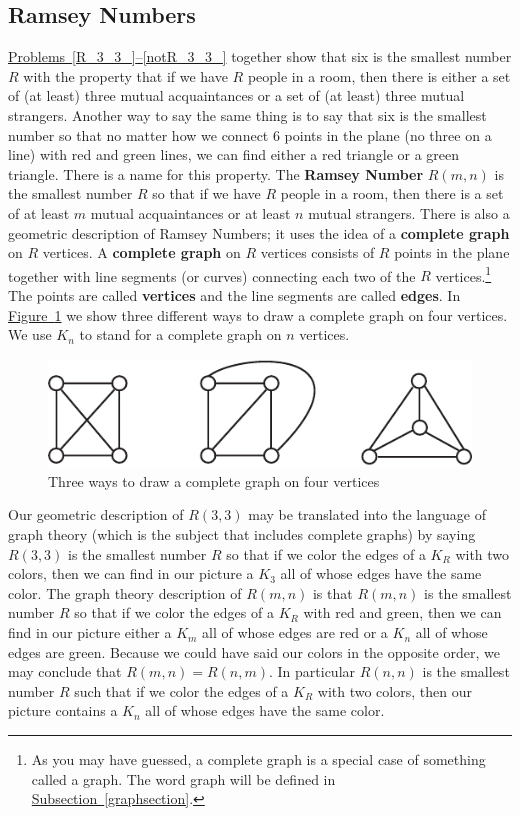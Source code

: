 \documentclass[10pt,]{book}
\newcommand{\terminology}[1]{\textbf{#1}}
\theoremstyle{plain}
\theoremstyle{definition}
\theoremstyle{definition}
\numberwithin{equation}{chapter}
\begin{document}
\subsection[{Ramsey Numbers}]{Ramsey Numbers}\label{Ramseysection}
\hyperref[R_3_3_]{Problems~\ref{R_3_3_}--\ref{notR_3_3_}} together show that six is the smallest number \(R\) with the property that if we have \(R\) people in a room, then there is either a set of (at least) three mutual acquaintances or a set of (at least) three mutual strangers. Another way to say the same thing is to say that six is the smallest number so that no matter how we connect 6 points in the plane (no three on a line) with red and green lines, we can find either a red triangle or a green triangle. There is a name for this property. The \terminology{Ramsey Number} \(R(m,n)\) is the smallest number \(R\) so that if we have \(R\) people in a room, then there is a set of at least \(m\) mutual acquaintances or at least \(n\) mutual strangers. There is also a geometric description of Ramsey Numbers; it uses the idea of a \terminology{complete graph} on \(R\) vertices. A \terminology{complete graph} on \(R\) vertices consists of \(R\) points in the plane together with line segments (or curves) connecting each two of the \(R\) vertices.\footnote{As you may have guessed, a complete graph is a special case of something called a graph.  The word graph will be defined in \hyperref[graphsection]{Subsection~\ref{graphsection}}.\label{fn-4}} The points are called \terminology{vertices} and the line segments are called \terminology{edges}. In \hyperref[completegraph]{Figure~\ref{completegraph}} we show three different ways to draw a complete graph on four vertices. We use \(K_n\) to stand for a complete graph on \(n\) vertices.%
\begin{figure}
\centering
\includegraphics[width=0.5\linewidth]{images/threeK4s}
\caption{Three ways to draw a complete graph on four vertices\label{completegraph}}
\end{figure}
Our geometric description of \(R(3,3)\) may be translated into the language of graph theory (which is the subject that includes complete graphs) by saying \(R(3,3)\) is the smallest number \(R\) so that if we color the edges of a \(K_R\) with two colors, then we can find in our picture a \(K_3\) all of whose edges have the same color.  The graph theory description of \(R(m,n)\) is that \(R(m,n)\) is the smallest number \(R\) so that if we color the edges of a \(K_R\) with red and green, then we can find in our picture either a \(K_m\) all of whose edges are red or a \(K_n\) all of whose edges are green. Because we could have said our colors in the opposite order, we may conclude that \(R(m,n) = R(n,m)\). In particular \(R(n,n)\) is the smallest number \(R\) such that if we color the edges of a \(K_R\) with two colors, then our picture contains a \(K_n\) all of whose edges have the same color.%
\end{document}
